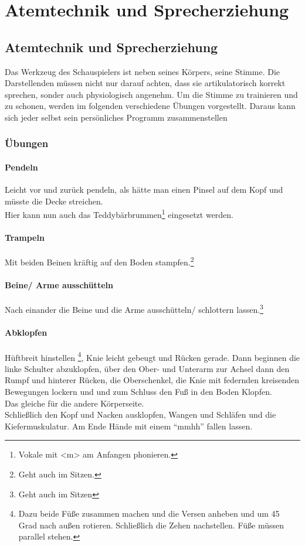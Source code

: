 \documentclass[ngerman, a4paper, twoside]{scrbook}%
\begin{document}
	\setcounter{chapter}{0}
	\setcounter{section}{0}
	\part{Atemtechnik und Sprecherziehung}
	\chapter{Atemtechnik und Sprecherziehung}
	Das Werkzeug des Schauspielers ist neben seines Körpers, seine Stimme. Die Darstellenden müssen nicht nur darauf achten, dass sie artikulatorisch korrekt sprechen, sonder auch physiologisch angenehm. Um die Stimme zu trainieren und zu schonen, werden im folgenden verschiedene Übungen vorgestellt. Daraus kann sich jeder selbst sein persönliches Programm zusammenstellen
	\section{Übungen}
	\subsection{Pendeln}
	Leicht vor und zurück pendeln, als hätte man einen Pinsel auf dem Kopf und müsste die Decke streichen.\\
	Hier kann nun auch das Teddybärbrummen\footnote{Vokale mit <m> am Anfangen phonieren.} eingesetzt werden.
	\subsection{Trampeln}
	Mit beiden Beinen kräftig auf den Boden stampfen.\footnote{Geht auch im Sitzen.}
	\subsection{Beine/ Arme ausschütteln}
	Nach einander die Beine und die Arme ausschütteln/ schlottern lassen.\footnote{Geht auch im Sitzen}
	\subsection{Abklopfen}
	Hüftbreit hinstellen \footnote{Dazu beide Füße zusammen machen und die Versen anheben und um 45 Grad nach außen rotieren. Schließlich die Zehen nachstellen. Füße müssen parallel stehen.}, Knie leicht gebeugt und Rücken gerade. Dann beginnen die linke Schulter abzuklopfen, über den Ober- und Unterarm zur Achsel dann den Rumpf und hinterer Rücken, die Oberschenkel, die Knie mit federnden kreisenden Bewegungen lockern und und zum Schluss den Fuß in den Boden Klopfen.\\
	 Das gleiche für die andere Körperseite.\\
	 Schließlich den Kopf und Nacken ausklopfen, Wangen und Schläfen und die Kiefermuskulatur.
	 Am Ende Hände mit einem "`mmhh"' fallen lassen.
\end{document}
